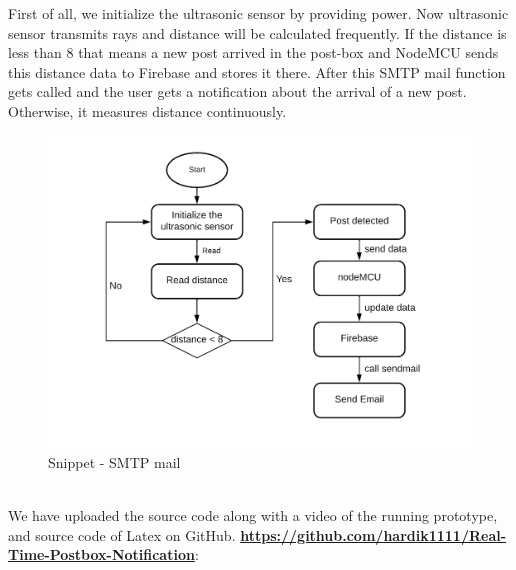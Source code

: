 First of all, we initialize the ultrasonic sensor by providing power. Now ultrasonic sensor transmits rays and distance will be calculated frequently. If the distance is less than 8 that means a new post arrived in the post-box and NodeMCU sends this distance data to Firebase and stores it there. After this SMTP mail function gets called and the user gets a notification about the arrival of a new post. Otherwise, it measures distance continuously. 
\begin{figure}[htp]
    \centering
    \includegraphics[width=12cm]{image/HCI.png}
    \caption{Snippet - SMTP mail}
    \label{fig:Flowchart}
\end{figure}\\
We have uploaded the source code along with a video of the running prototype, and source code of Latex on GitHub. \textbf{\href{https://github.com/hardik1111/Real-Time-Postbox-Notification}{https://github.com/hardik1111/Real-Time-Postbox-Notification}}:

